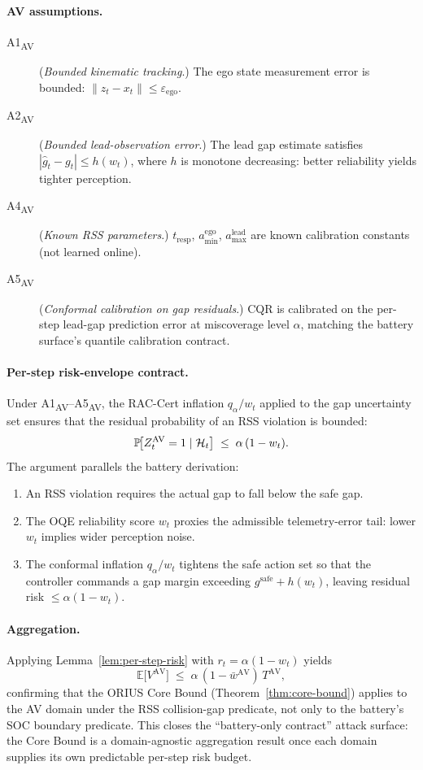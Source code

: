 \paragraph{AV assumptions.}
\begin{description}
  \item[A1\textsubscript{AV}] (\emph{Bounded kinematic tracking}.)
    The ego state measurement error is bounded:
    $\|z_t - x_t\| \le \varepsilon_{\text{ego}}$.
  \item[A2\textsubscript{AV}] (\emph{Bounded lead-observation error}.)
    The lead gap estimate satisfies
    $|\hat{g}_t - g_t| \le h(w_t)$, where $h$ is monotone decreasing:
    better reliability yields tighter perception.
  \item[A4\textsubscript{AV}] (\emph{Known RSS parameters}.)
    $t_{\text{resp}}$, $a_{\min}^{\text{ego}}$, $a_{\max}^{\text{lead}}$ are
    known calibration constants (not learned online).
  \item[A5\textsubscript{AV}] (\emph{Conformal calibration on gap residuals}.)
    CQR is calibrated on the per-step lead-gap prediction error at
    miscoverage level $\alpha$, matching the battery surface's quantile
    calibration contract.
\end{description}

\paragraph{Per-step risk-envelope contract.}
Under A1\textsubscript{AV}--A5\textsubscript{AV}, the RAC-Cert inflation
$q_\alpha / w_t$ applied to the gap uncertainty set ensures that the
residual probability of an RSS violation is bounded:
\[
  \operatorname{\mathbb{P}}\!\bigl[Z_t^{\text{AV}} = 1 \mid \mathcal{H}_t\bigr]
  \;\le\;
  \alpha\,(1 - w_t).
\]
The argument parallels the battery derivation:
\begin{enumerate}
  \item An RSS violation requires the actual gap to fall below the safe gap.
  \item The OQE reliability score $w_t$ proxies the admissible
    telemetry-error tail: lower $w_t$ implies wider perception noise.
  \item The conformal inflation $q_\alpha / w_t$ tightens the safe action set
    so that the controller commands a gap margin exceeding
    $g^{\text{safe}} + h(w_t)$, leaving residual risk $\le \alpha(1 - w_t)$.
\end{enumerate}

\paragraph{Aggregation.}
Applying Lemma~\ref{lem:per-step-risk} with $r_t = \alpha(1-w_t)$ yields
\[
  \mathbb{E}\!\bigl[V^{\text{AV}}\bigr]
  \;\le\;
  \alpha\,(1 - \bar{w}^{\text{AV}})\,T^{\text{AV}},
\]
confirming that the ORIUS Core Bound (Theorem~\ref{thm:core-bound}) applies
to the AV domain under the RSS collision-gap predicate, not only to the
battery's SOC boundary predicate.  This closes the ``battery-only contract''
attack surface: the Core Bound is a domain-agnostic aggregation result once
each domain supplies its own predictable per-step risk budget.

